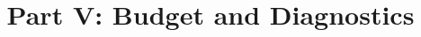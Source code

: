 \documentclass[12pt]{book}
\begin{document}


\title{Part V: Budget and Diagnostics}
\dominitoc
\tableofcontents



\end{document}
